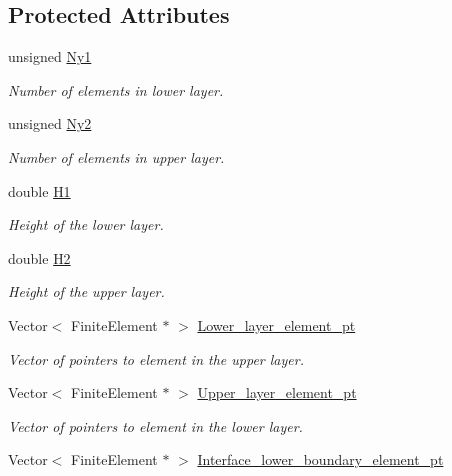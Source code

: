 \subsection*{Protected Attributes}
\begin{DoxyCompactItemize}
\item 
unsigned \hyperlink{classoomph_1_1TwoLayerSpineMesh_a614e800b8c5ba2963254e7e41bcfc9e2}{Ny1}
\begin{DoxyCompactList}\small\item\em Number of elements in lower layer. \end{DoxyCompactList}\item 
unsigned \hyperlink{classoomph_1_1TwoLayerSpineMesh_a48a69edc318571675eed16c9154235e3}{Ny2}
\begin{DoxyCompactList}\small\item\em Number of elements in upper layer. \end{DoxyCompactList}\item 
double \hyperlink{classoomph_1_1TwoLayerSpineMesh_ad98f7a291c592042279f0498ea3ec5c9}{H1}
\begin{DoxyCompactList}\small\item\em Height of the lower layer. \end{DoxyCompactList}\item 
double \hyperlink{classoomph_1_1TwoLayerSpineMesh_a0a7e5f7297ad653440d7d833c89d1b44}{H2}
\begin{DoxyCompactList}\small\item\em Height of the upper layer. \end{DoxyCompactList}\item 
Vector$<$ Finite\+Element $\ast$ $>$ \hyperlink{classoomph_1_1TwoLayerSpineMesh_aaadaab14aab4d597dab78758a1a93ad8}{Lower\+\_\+layer\+\_\+element\+\_\+pt}
\begin{DoxyCompactList}\small\item\em Vector of pointers to element in the upper layer. \end{DoxyCompactList}\item 
Vector$<$ Finite\+Element $\ast$ $>$ \hyperlink{classoomph_1_1TwoLayerSpineMesh_a7ea2169026ec75ecf1d727f022311b65}{Upper\+\_\+layer\+\_\+element\+\_\+pt}
\begin{DoxyCompactList}\small\item\em Vector of pointers to element in the lower layer. \end{DoxyCompactList}\item 
Vector$<$ Finite\+Element $\ast$ $>$ \hyperlink{classoomph_1_1TwoLayerSpineMesh_aaa5c2ad2f61cd7637b12573265b42bd7}{Interface\+\_\+lower\+\_\+boundary\+\_\+element\+\_\+pt}

\end{DoxyCompactItemize}
